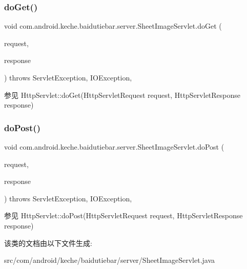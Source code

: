 \subsubsection{\texorpdfstring{do\+Get()}{doGet()}}
{\footnotesize\ttfamily void com.\+android.\+keche.\+baidutiebar.\+server.\+Sheet\+Image\+Servlet.\+do\+Get (\begin{DoxyParamCaption}\item[{Http\+Servlet\+Request}]{request,  }\item[{Http\+Servlet\+Response}]{response }\end{DoxyParamCaption}) throws Servlet\+Exception, I\+O\+Exception\hspace{0.3cm}{\ttfamily [inline]}, {\ttfamily [protected]}}

\begin{DoxySeeAlso}{参见}
Http\+Servlet\+::do\+Get(\+Http\+Servlet\+Request request, Http\+Servlet\+Response response) 
\end{DoxySeeAlso}
\mbox{\label{classcom_1_1android_1_1keche_1_1baidutiebar_1_1server_1_1_sheet_image_servlet_af1fb2138384d4741e045a925abfa59e4}} 
\subsubsection{\texorpdfstring{do\+Post()}{doPost()}}
{\footnotesize\ttfamily void com.\+android.\+keche.\+baidutiebar.\+server.\+Sheet\+Image\+Servlet.\+do\+Post (\begin{DoxyParamCaption}\item[{Http\+Servlet\+Request}]{request,  }\item[{Http\+Servlet\+Response}]{response }\end{DoxyParamCaption}) throws Servlet\+Exception, I\+O\+Exception\hspace{0.3cm}{\ttfamily [inline]}, {\ttfamily [protected]}}

\begin{DoxySeeAlso}{参见}
Http\+Servlet\+::do\+Post(\+Http\+Servlet\+Request request, Http\+Servlet\+Response response) 
\end{DoxySeeAlso}


该类的文档由以下文件生成\+:\begin{DoxyCompactItemize}
\item 
src/com/android/keche/baidutiebar/server/Sheet\+Image\+Servlet.\+java\end{DoxyCompactItemize}
